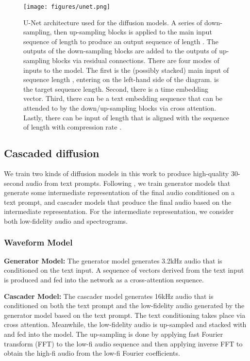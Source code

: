 \documentclass[nohyperref]{article}
\theoremstyle{plain}
\theoremstyle{definition}
\theoremstyle{remark}
\begin{document}
\begin{figure*}[ht]
\vskip 0.05in
\begin{center}
\centerline{\texttt{[image: figures/unet.png]}}
\vskip -0.05in
\caption{U-Net architecture used for the diffusion models. A series of down-sampling, then up-sampling blocks is applied to the main input sequence of length  to produce an output sequence of length . The outputs of the down-sampling blocks are added to the outputs of up-sampling blocks via residual connections. There are four modes of inputs to the model. The first is the (possibly stacked) main input of sequence length , entering on the left-hand side of the diagram.  is the target sequence length. Second, there is a time embedding vector. Third, there can be a text embedding sequence that can be attended to by the down/up-sampling blocks via cross attention. Lastly, there can be input of length  that is aligned with the sequence of length  with compression rate .}
\label{U-Net}
\end{center}
\vskip -0.25in
\end{figure*}


\subsection{Cascaded diffusion}

We train two kinds of diffusion models in this work to produce high-quality 30-second audio from text prompts. Following \cite{ho2022cascaded}, we train generator models that generate some intermediate representation of the final audio conditioned on a text prompt, and cascader models that produce the final audio based on the intermediate representation. For the intermediate representation, we consider both low-fidelity audio and spectrograms.

\subsubsection{Waveform Model}

\textbf{Generator Model:} The generator model generates 3.2kHz audio that is conditioned on the text input. A sequence of vectors derived from the text input is produced and fed into the network as a cross-attention sequence.

\textbf{Cascader Model:} The cascader model generates 16kHz audio that is conditioned on both the text prompt and the low-fidelity audio generated by the generator model based on the text prompt. The text conditioning takes place via cross attention. Meanwhile, the low-fidelity audio is up-sampled and stacked with  and fed into the model. The up-sampling is done by applying fast Fourier transform (FFT) to the low-fi audio sequence and then applying inverse FFT to obtain the high-fi audio from the low-fi Fourier coefficients.
\end{document}
